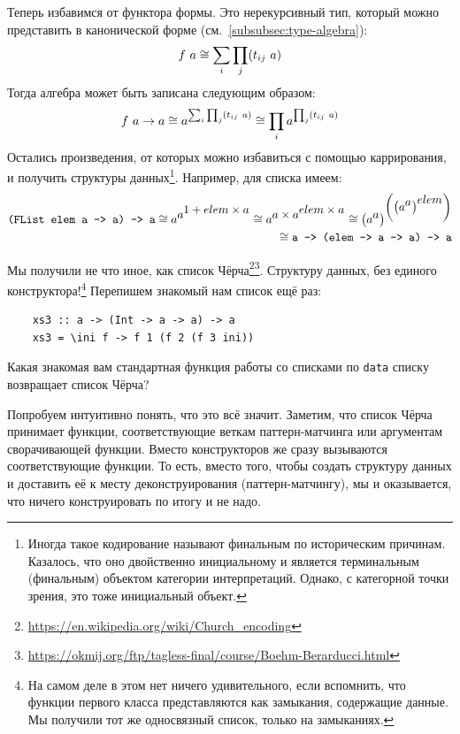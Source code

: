 Теперь избавимся от функтора формы.
Это нерекурсивный тип, который можно представить в канонической форме (см.~\ref{subsubsec:type-algebra}):
\[
    f~ a \cong \sum_{i}\prod_{j} (t_{ij}~ a)
\]
Тогда алгебра может быть записана следующим образом:
\[
    f~ a\to a\cong a^{\sum_{i}\prod_{j} (t_{ij}~ a)} \cong \prod_{i}a^{\prod_{j} (t_{ij}~ a)}
\]
Остались произведения, от которых можно избавиться с помощью каррирования, и получить  структуры данных\footnote{Иногда такое кодирование называют финальным по историческим причинам. Казалось, что оно двойственно инициальному и является терминальным (финальным) объектом категории интерпретаций. Однако, с категорной точки зрения, это тоже инициальный объект.}.
Например, для списка имеем:
\begin{align*}
    \text{\texttt{(FList elem a -> a) -> a}}
    \cong a^{\displaystyle a^{\displaystyle 1 + elem\times a}}
    \cong a^{\displaystyle a\times a^{\displaystyle elem\times a}}
    \cong \left( a^{\displaystyle a} \right)^{\displaystyle \left(\left( a^{\displaystyle a}\right)^{\displaystyle elem}\right)} \\
    \cong \text{\texttt{a -> (elem -> a -> a) -> a}}
\end{align*}

Мы получили не что иное, как список Чёрча\footnote{\url{https://en.wikipedia.org/wiki/Church_encoding}}\footnote{\url{https://okmij.org/ftp/tagless-final/course/Boehm-Berarducci.html}}.
Структуру данных, без единого конструктора!\footnote{На самом деле в этом нет ничего удивительного, если вспомнить, что функции первого класса представляются как замыкания, содержащие данные. Мы получили тот же односвязный список, только на замыканиях.}
Перепишем знакомый нам список ещё раз:
\begin{verbatim}
    xs3 :: a -> (Int -> a -> a) -> a
    xs3 = \ini f -> f 1 (f 2 (f 3 ini))
\end{verbatim}

\begin{task}
    Какая знакомая вам стандартная функция работы со списками по \texttt{data} списку возвращает список Чёрча?
\end{task}

Попробуем интуитивно понять, что это всё значит.
Заметим, что список Чёрча принимает функции, соответствующие веткам паттерн-матчинга или аргументам сворачивающей функции.
Вместо конструкторов же сразу вызываются соответствующие функции.
То есть, вместо того, чтобы создать структуру данных и доставить её к месту деконструирования (паттерн-матчингу), мы  и оказывается, что ничего конструировать по итогу и не надо.


